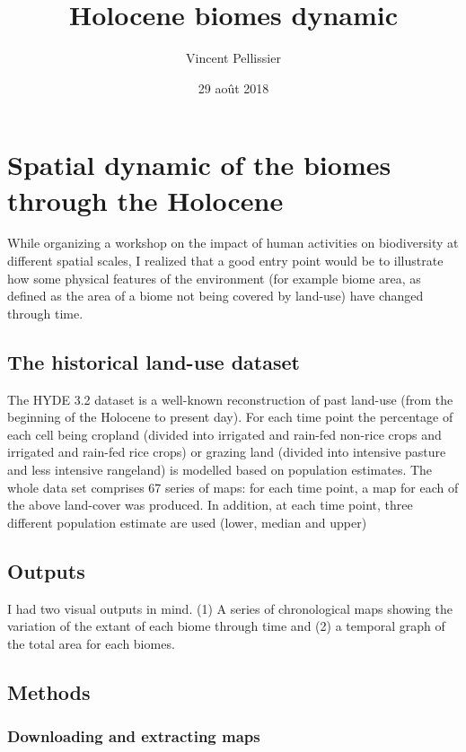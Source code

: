 \documentclass[]{article}
\title{Holocene biomes dynamic}
\author{Vincent Pellissier}
\date{29 août 2018}
\begin{document}
\maketitle

\section{Spatial dynamic of the biomes through the
Holocene}\label{spatial-dynamic-of-the-biomes-through-the-holocene}

While organizing a workshop on the impact of human activities on
biodiversity at different spatial scales, I realized that a good entry
point would be to illustrate how some physical features of the
environment (for example biome area, as defined as the area of a biome
not being covered by land-use) have changed through time.

\subsection{The historical land-use
dataset}\label{the-historical-land-use-dataset}

The HYDE 3.2 dataset is a well-known reconstruction of past land-use
(from the beginning of the Holocene to present day). For each time point
the percentage of each cell being cropland (divided into irrigated and
rain-fed non-rice crops and irrigated and rain-fed rice crops) or
grazing land (divided into intensive pasture and less intensive
rangeland) is modelled based on population estimates. The whole data set
comprises 67 series of maps: for each time point, a map for each of the
above land-cover was produced. In addition, at each time point, three
different population estimate are used (lower, median and upper)

\subsection{Outputs}\label{outputs}

I had two visual outputs in mind. (1) A series of chronological maps
showing the variation of the extant of each biome through time and (2) a
temporal graph of the total area for each biomes.

\subsection{Methods}\label{methods}

\subsubsection{Downloading and extracting
maps}\label{downloading-and-extracting-maps}
\end{document}
